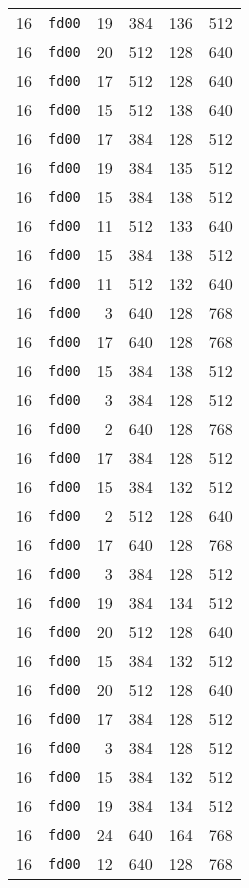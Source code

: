 \documentclass{article}
\begin{document}
\begin{table}[h!]
\begin{tabular}{llrrrl}
    16 & \texttt{fd00} & 19 & 384 & 136 & 512 \\
    16 & \texttt{fd00} & 20 & 512 & 128 & 640 \\
    16 & \texttt{fd00} & 17 & 512 & 128 & 640 \\
    16 & \texttt{fd00} & 15 & 512 & 138 & 640 \\
    16 & \texttt{fd00} & 17 & 384 & 128 & 512 \\
    16 & \texttt{fd00} & 19 & 384 & 135 & 512 \\
    16 & \texttt{fd00} & 15 & 384 & 138 & 512 \\
    16 & \texttt{fd00} & 11 & 512 & 133 & 640 \\
    16 & \texttt{fd00} & 15 & 384 & 138 & 512 \\
    16 & \texttt{fd00} & 11 & 512 & 132 & 640 \\
    16 & \texttt{fd00} & 3 & 640 & 128 & 768 \\
    16 & \texttt{fd00} & 17 & 640 & 128 & 768 \\
    16 & \texttt{fd00} & 15 & 384 & 138 & 512 \\
    16 & \texttt{fd00} & 3 & 384 & 128 & 512 \\
    16 & \texttt{fd00} & 2 & 640 & 128 & 768 \\
    16 & \texttt{fd00} & 17 & 384 & 128 & 512 \\
    16 & \texttt{fd00} & 15 & 384 & 132 & 512 \\
    16 & \texttt{fd00} & 2 & 512 & 128 & 640 \\
    16 & \texttt{fd00} & 17 & 640 & 128 & 768 \\
    16 & \texttt{fd00} & 3 & 384 & 128 & 512 \\
    16 & \texttt{fd00} & 19 & 384 & 134 & 512 \\
    16 & \texttt{fd00} & 20 & 512 & 128 & 640 \\
    16 & \texttt{fd00} & 15 & 384 & 132 & 512 \\
    16 & \texttt{fd00} & 20 & 512 & 128 & 640 \\
    16 & \texttt{fd00} & 17 & 384 & 128 & 512 \\
    16 & \texttt{fd00} & 3 & 384 & 128 & 512 \\
    16 & \texttt{fd00} & 15 & 384 & 132 & 512 \\
    16 & \texttt{fd00} & 19 & 384 & 134 & 512 \\
    16 & \texttt{fd00} & 24 & 640 & 164 & 768 \\
    16 & \texttt{fd00} & 12 & 640 & 128 & 768 \\

\end{tabular}
\end{table}
\end{document}
